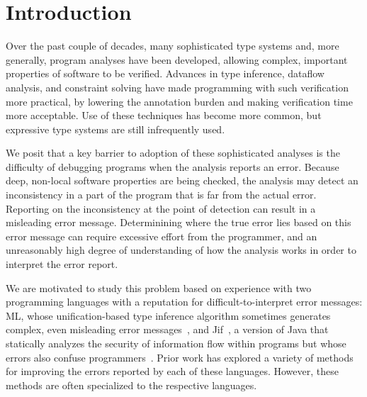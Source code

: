 \begin{abstract}

\end{abstract}

\section{Introduction}

Over the past couple of decades, many sophisticated type systems and,
more generally, program analyses have been developed, allowing
complex, important properties of software to be verified. Advances in
type inference, dataflow analysis, and constraint solving have made
programming with such verification more practical, by lowering the
annotation burden and making verification time more acceptable.  Use
of these techniques has become more common, but expressive type
systems are still infrequently used.

We posit that a key barrier to adoption of these sophisticated
analyses is the difficulty of debugging programs when the analysis
reports an error. Because deep, non-local software properties are
being checked, the analysis may detect an inconsistency in a part of
the program that is far from the actual error. Reporting on the
inconsistency at the point of detection can result in a misleading
error message. Determinining where the true error lies based on this
error message can require excessive effort from the programmer, and an
unreasonably high degree of understanding of how the analysis works
in order to interpret the error report.

We are motivated to study this problem based on experience with two
programming languages with a reputation for difficult-to-interpret
error messages: ML, whose unification-based type inference algorithm
sometimes generates complex, even misleading error
messages~\cite{wand-errorfinding}, and Jif~\cite{jif}, a version of
Java that statically analyzes the security of information flow within
programs but whose errors also confuse programmers~\cite{king:fse}.
Prior work has explored a variety of methods for improving the errors
reported by each of these languages. However, these methods are often
specialized to the respective languages.

